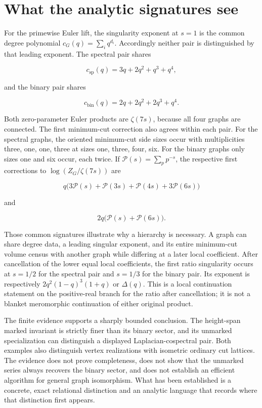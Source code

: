 \documentclass[
  11pt,
  a4paper,
]{report}
\begin{document}
\hypertarget{what-the-analytic-signatures-see}{%
\section{What the analytic signatures
see}\label{what-the-analytic-signatures-see}}

For the primewise Euler lift, the singularity exponent at \(s=1\) is the
common degree polynomial \(c_G(q)=\sum_iq^{d_i}\). Accordingly neither
pair is distinguished by that leading exponent. The spectral pair shares

\[
c_{\mathrm{sp}}(q)=3q+2q^2+q^3+q^4,
\]

and the binary pair shares

\[
c_{\mathrm{bin}}(q)=2q+2q^2+2q^3+q^4.
\]

Both zero-parameter Euler products are \(\zeta(7s)\), because all four
graphs are connected. The first minimum-cut correction also agrees
within each pair. For the spectral graphs, the oriented minimum-cut side
sizes occur with multiplicities three, one, one, three at sizes one,
three, four, six. For the binary graphs only sizes one and six occur,
each twice. If \(\mathcal P(s)=\sum_pp^{-s}\), the respective first
corrections to \(\log(Z_G/\zeta(7s))\) are

\[
q\bigl(3\mathcal P(s)+\mathcal P(3s)+\mathcal P(4s)+3\mathcal P(6s)\bigr)
\]

and

\[
2q\bigl(\mathcal P(s)+\mathcal P(6s)\bigr).
\]

Those common signatures illustrate why a hierarchy is necessary. A graph
can share degree data, a leading singular exponent, and its entire
minimum-cut volume census with another graph while differing at a later
local coefficient. After cancellation of the lower equal local
coefficients, the first ratio singularity occurs at \(s=1/2\) for the
spectral pair and \(s=1/3\) for the binary pair. Its exponent is
respectively \(2q^2(1-q)^3(1+q)\) or \(\Delta(q)\). This is a local
continuation statement on the positive-real branch for the ratio after
cancellation; it is not a blanket meromorphic continuation of either
original product.

The finite evidence supports a sharply bounded conclusion. The
height-span marked invariant is strictly finer than its binary sector,
and its unmarked specialization can distinguish a displayed
Laplacian-cospectral pair. Both examples also distinguish vertex
realizations with isometric ordinary cut lattices. The evidence does not
prove completeness, does not show that the unmarked series always
recovers the binary sector, and does not establish an efficient
algorithm for general graph isomorphism. What has been established is a
concrete, exact relational distinction and an analytic language that
records where that distinction first appears.
\end{document}
